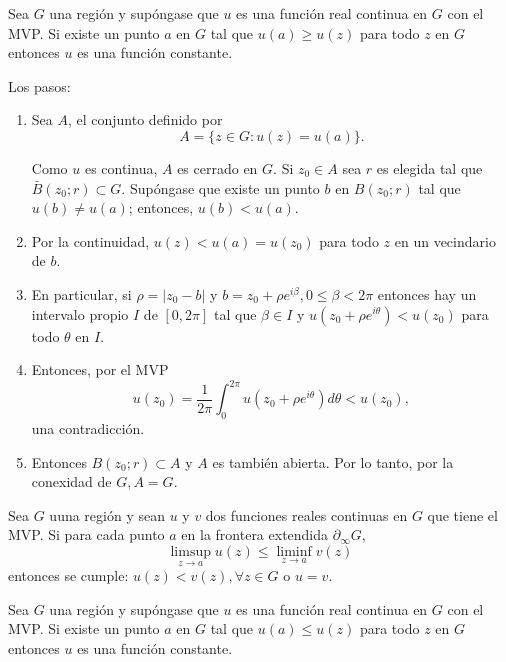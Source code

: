 \begin{teorema}
    Sea $G$  una región y supóngase que $u$ es una función real continua  en $G$ con el MVP. Si existe un punto $a$ en $G$  tal que $u(a) \geq u(z)$  para todo $z$ en $G$ entonces $u$ es una función constante.
    \begin{dem}
        Los pasos: 
        \begin{enumerate}
            \item  Sea $A$, el conjunto definido por
            $$
            A=\{z \in G: u(z)=u(a)\} .
            $$
            
            Como $u$ es continua, $A$ es cerrado en $G$. Si $z_0 \in A$ sea $r$  es elegida tal que  $\bar{B}\left(z_0 ; r\right) \subset G$. Supóngase que existe un punto $b$ en $B\left(z_0 ; r\right)$ tal que $u(b) \neq u(a)$; entonces, $u(b)<u(a)$. 

            \item  Por la continuidad, $u(z)<u(a)=u\left(z_0\right)$ para todo $z$ en un vecindario de $b$. 
            \item En particular, si $\rho=\left|z_0-b\right|$ y $b=z_0+\rho e^{i \beta}, 0 \leq \beta<2 \pi$ entonces hay un intervalo propio $I$ de $[0,2 \pi]$ tal que  $\beta \in I$ y $u\left(z_0+\rho e^{i \theta}\right)<u\left(z_0\right)$ para todo $\theta$ en $I$.
            \item Entonces, por el MVP
            $$
            u\left(z_0\right)=\frac{1}{2 \pi} \int_0^{2 \pi} u\left(z_0+\rho e^{i \theta}\right) d \theta<u\left(z_0\right),
            $$
            una contradicción.
            \item Entonces $B\left(z_0 ; r\right) \subset A$ y $A$ es también abierta. Por lo tanto, por la conexidad de $G, A=G$.
        \end{enumerate}
    
    \end{dem}
\end{teorema}

\begin{teorema}
    Sea $G$ uuna región y sean $u$ y $v$ dos funciones reales continuas en $G$ que tiene el MVP. Si para cada punto $a$ en la frontera extendida $\partial_{\infty} G$,
$$
\limsup _{z \rightarrow a} u(z) \leq \liminf _{z \rightarrow a} v(z)
$$
entonces se cumple: $u(z)<v(z),\forall z\in G$ o $u=v$.
\end{teorema}


\begin{teorema}
    Sea $G$ una región y supóngase que $u$  es una función real continua en $G$ con el MVP. Si existe un punto $a$ en $G$ tal que $u(a) \leq u(z)$ para todo $z$ en $G$ entonces $u$ es una función constante.
\end{teorema}
